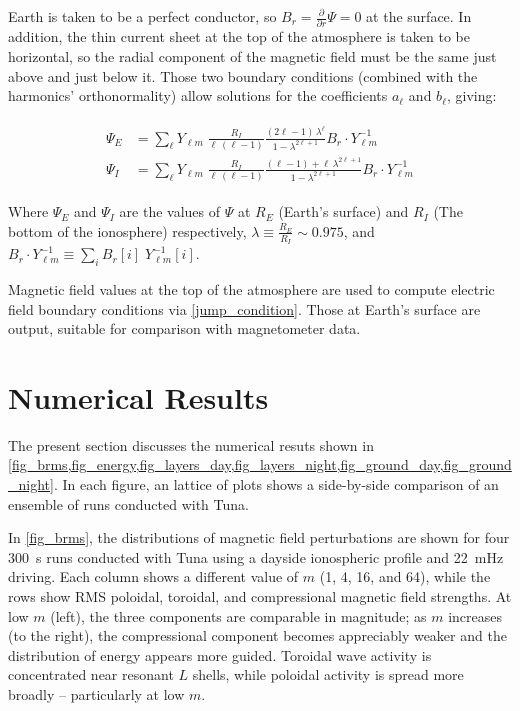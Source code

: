\documentclass[draft,linenumbers]{agujournal}
\begin{document}
Earth is taken to be a perfect conductor, so $B_r = \frac{\partial}{\partial r} \Psi = 0$ at the surface. In addition, the thin current sheet at the top of the atmosphere is taken to be horizontal, so the radial component of the magnetic field must be the same just above and just below it. Those two boundary conditions (combined with the harmonics' orthonormality) allow solutions for the coefficients $a_\ell$ and $b_\ell$, giving:
\begin{linenomath*}
\begin{align}
  \label{psi_final}
  \begin{split}
  \Psi_E &= \displaystyle\sum_\ell Y_{\ell m} \; \frac{R_I}{ \ell \, \left(\ell - 1\right) } \frac{ \left(2 \ell - 1\right) \, \lambda^\ell }{ 1 - \lambda^{2 \ell + 1} } B_r \cdot Y_{\ell m}^{-1} \\
  \Psi_I &= \displaystyle\sum_\ell Y_{\ell m} \; \frac{R_I}{ \ell \, \left(\ell - 1\right) } \frac{ \left(\ell - 1\right) + \ell \, \lambda^{2 \ell + 1} }{ 1 - \lambda^{2 \ell + 1} } B_r \cdot Y_{\ell m}^{-1}
  \end{split}
\end{align}
\end{linenomath*}

Where $\Psi_E$ and $\Psi_I$ are the values of $\Psi$ at $R_E$ (Earth's surface) and $R_I$ (The bottom of the ionosphere) respectively, $\lambda \equiv \frac{R_E}{R_I} \sim \num{0.975}$, and $B_r \cdot Y_{\ell m}^{-1} \equiv \displaystyle\sum_i B_r [i] \; Y_{\ell m}^{-1} \! [i]$.

Magnetic field values at the top of the atmosphere are used to compute electric field boundary conditions via \cref{jump_condition}. Those at Earth's surface are output, suitable for comparison with magnetometer data.


\section{Numerical Results}

The present section discusses the numerical resuts shown in \cref{fig_brms,fig_energy,fig_layers_day,fig_layers_night,fig_ground_day,fig_ground_night}. In each figure, an lattice of plots shows a side-by-side comparison of an ensemble of runs conducted with Tuna.

In \cref{fig_brms}, the distributions of magnetic field perturbations are shown for four \SI{300}{\second} runs conducted with Tuna using a dayside ionospheric profile and \SI{22}{\mHz} driving. Each column shows a different value of $m$ (1, 4, 16, and 64), while the rows show RMS poloidal, toroidal, and compressional magnetic field strengths. At low $m$ (left), the three components are comparable in magnitude; as $m$ increases (to the right), the compressional component becomes appreciably weaker and the distribution of energy appears more guided. Toroidal wave activity is concentrated near resonant $L$ shells, while poloidal activity is spread more broadly -- particularly at low $m$.
\end{document}
